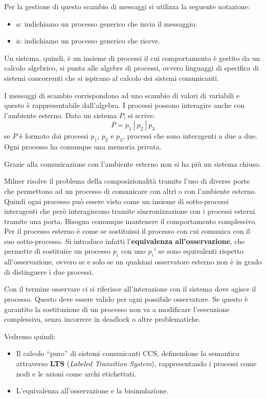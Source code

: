 Per la gestione di questo scambio di messaggi si utilizza la seguente notazione: 
\begin{itemize}
    \item \textbf{$a$}: indichiamo un processo generico che invia il messaggio.
    \item \textbf{$\overline{a}$}: indichiamo un processo generico che riceve.
\end{itemize}

Un sistema, quindi, è un insieme di processi il cui comportamento è gestito da un calcolo algebrico, si punta alle algebre di processi, ovvero linguaggi di specifica di sistemi concorrenti che si ispirano al calcolo dei sistemi comunicanti.

I messaggi di scambio corrispondono ad uno scambio di valori di variabili e questo è rappresentabile dall'algebra. I processi possono interagire anche con l'ambiente esterno. Dato un sistema $P$, si scrive: $$ P = p_1 \ | \ p_2 \ | \ p_3$$ se $P$ è formato dai processi $p_1$, $p_2$ e $p_3$, processi che sono interagenti a due a due. Ogni processo ha comunque una memoria privata.

Grazie alla comunicazione con l'ambiente esterno non si ha più un sistema chiuso.

Milner risolve il problema della composizionalità tramite l'uso di diverse porte che permettono ad un processo di comunicare con altri o con l'ambiente esterno. Quindi ogni processo può essere visto come un insieme di sotto-processi interagenti che però interagiscono tramite sincronizzazione con i processi esterni tramite una porta. Bisogna comunque mantenere il comportamento complessivo. Per il processo esterno è come se sostituissi il processo con cui comunica con il suo sotto-processo. Si introduce infatti l'\textbf{equivalenza all'osservazione}, che permette di sostituire un processo $p_i$ con uno $p_i'$ se sono equivalenti rispetto all'osservazione, ovvero se e solo se un qualsiasi osservatore esterno non è in grado di distinguere i due processi. 

Con il termine osservare ci si riferisce all’interazione con il sistema dove agisce il processo. Questo deve essere valido per ogni possibile osservatore. Se questo è garantito la sostituzione di un processo non va a modificare l'esecuzione complessiva, senza incorrere in deadlock o altre problematiche.

Vedremo quindi:
\begin{itemize}
    \item Il calcolo “puro” di sistemi comunicanti CCS, definendone la semantica attraverso \textbf{LTS} (\textit{Labeled Transition System}), rappresentando i processi come nodi e le azioni come archi etichettati.
    \item L'equivalenza all'osservazione e la bisimulazione.
\end{itemize}
